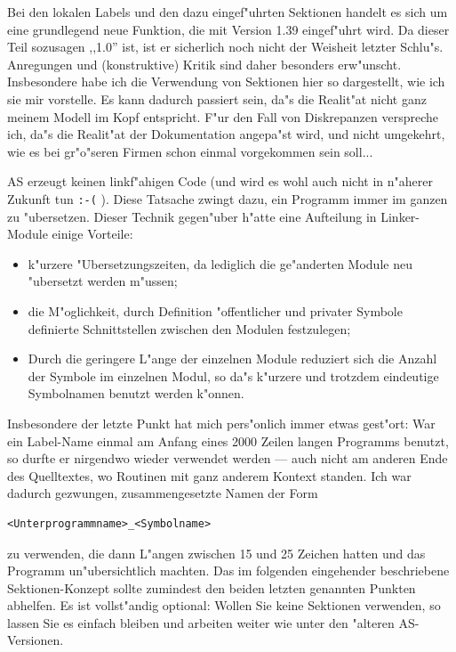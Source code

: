 \documentclass[12pt,a4paper,twoside]{report}
\newcommand{\tty}[1]{{\tt #1}}
\newcommand{\asname}{AS}
\begin{document}
Bei den lokalen Labels und den dazu eingef"uhrten Sektionen handelt es
sich um eine grundlegend neue Funktion, die mit Version 1.39 eingef"uhrt
wird.  Da dieser Teil sozusagen ,,1.0'' ist, ist er sicherlich noch nicht
der Weisheit letzter Schlu"s.  Anregungen und (konstruktive) Kritik sind
daher besonders erw"unscht.  Insbesondere habe ich die Verwendung von
Sektionen hier so dargestellt, wie ich sie mir vorstelle.  Es kann dadurch
passiert sein, da"s die Realit"at nicht ganz meinem Modell im Kopf entspricht.
F"ur den Fall von Diskrepanzen verspreche ich, da"s die Realit"at der
Dokumentation angepa"st wird, und nicht umgekehrt, wie es bei gr"o"seren
Firmen schon einmal vorgekommen sein soll...
\par
\asname{} erzeugt keinen linkf"ahigen Code (und wird es wohl auch nicht in n"aherer
Zukunft tun \tty{:-(} ).  Diese Tatsache zwingt dazu, ein Programm immer im ganzen
zu "ubersetzen.  Dieser Technik gegen"uber h"atte eine Aufteilung in
Linker-Module einige Vorteile:
\begin{itemize}
\item{k"urzere "Ubersetzungszeiten, da lediglich die ge"anderten Module
      neu "ubersetzt werden m"ussen;}
\item{die M"oglichkeit, durch Definition "offentlicher und privater
      Symbole definierte Schnittstellen zwischen den Modulen festzulegen;}
\item{Durch die geringere L"ange der einzelnen Module reduziert sich die
      Anzahl der Symbole im einzelnen Modul, so da"s k"urzere und trotzdem
      eindeutige Symbolnamen benutzt werden k"onnen.}
\end{itemize}
Insbesondere der letzte Punkt hat mich pers"onlich immer etwas gest"ort:
War ein Label-Name einmal am Anfang eines 2000 Zeilen langen Programms
benutzt, so durfte er nirgendwo wieder verwendet werden --- auch nicht am
anderen Ende des Quelltextes, wo Routinen mit ganz anderem Kontext standen.
Ich war dadurch gezwungen, zusammengesetzte Namen der Form
\begin{verbatim}
<Unterprogrammname>_<Symbolname>
\end{verbatim}
zu verwenden, die dann L"angen zwischen 15 und 25 Zeichen hatten und das
Programm un"ubersichtlich machten.
Das im folgenden eingehender beschriebene Sektionen-Konzept sollte zumindest
den beiden letzten genannten Punkten abhelfen.  Es ist vollst"andig optional:
Wollen Sie keine Sektionen verwenden, so lassen Sie es einfach bleiben
und arbeiten weiter wie unter den "alteren \asname{}-Versionen.
\end{document}
